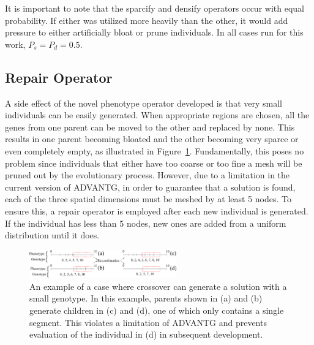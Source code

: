 \documentclass[conference]{IEEEtran}
\begin{document}
It is important to note that the sparcify and densify operators occur with equal probability. If either was utilized more heavily than the other, it would add pressure to either artificially bloat or prune individuals. In all cases run for this work, $P_s = P_d = 0.5$.

\subsection{Repair Operator}
A side effect of the novel phenotype operator developed is that very small individuals can be easily generated. When appropriate regions are chosen, all the genes from one parent can be moved to the other and replaced by none. This results in one parent becoming bloated and the other becoming very sparce or even completely empty, as illustrated in Figure~\ref{fig:emptyxover}. Fundamentally, this poses no problem since individuals that either have too coarse or too fine a mesh will be pruned out by the evolutionary process. However, due to a limitation in the current version of ADVANTG, in order to guarantee that a solution is found, each of the three spatial dimensions must be meshed by at least 5 nodes. To ensure this, a repair operator is employed after each new individual is generated. If the individual has less than 5 nodes, new ones are added from a uniform distribution until it does.
\begin{figure}[!t]
\centering
\includegraphics[width=2.5in]{emptyxover}
\caption{An example of a case where crossover can generate a solution with a small genotype. In this example, parents shown in (a) and (b) generate children in (c) and (d), one of which only contains a single segment. This violates a limitation of ADVANTG and prevents evaluation of the individual in (d) in subsequent development.}
\label{fig:emptyxover}
\end{figure}

\end{document}
